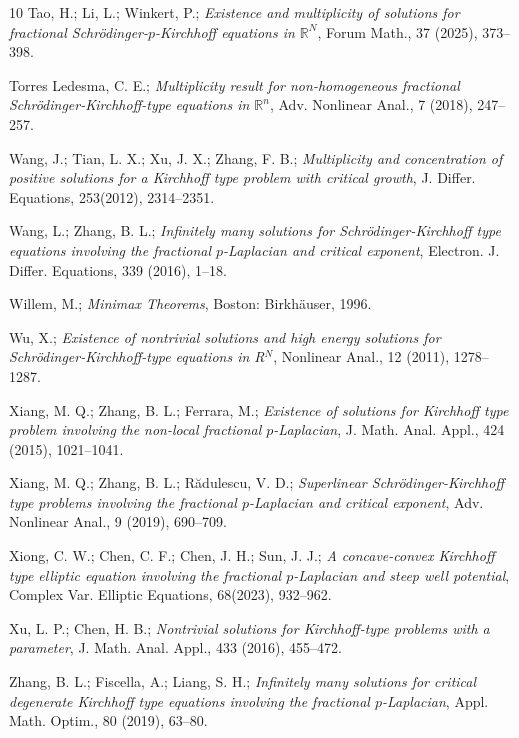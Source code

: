 \documentclass[reqno]{amsart}
\begin{document}
\begin{thebibliography}{10}
 Tao, H.; Li, L.; Winkert, P.;
\emph{Existence and multiplicity of solutions for fractional Schr\"{o}dinger-$p$-Kirchhoff equations in $\mathbb{R}^N$},
Forum Math., 37 (2025), 373--398.

 Torres Ledesma, C. E.;
\emph{Multiplicity result for non-homogeneous fractional Schr\"{o}dinger-Kirchhoff-type equations in $\mathbb{R}^n$},
Adv. Nonlinear Anal., 7 (2018), 247--257.

 Wang, J.; Tian, L. X.; Xu, J. X.; Zhang, F. B.;
\emph{Multiplicity and concentration of positive solutions for a Kirchhoff type problem with critical growth},
J. Differ. Equations, 253(2012), 2314--2351.

 Wang, L.; Zhang, B. L.;
\emph{Infinitely many solutions for Schr\"{o}dinger-Kirchhoff type equations involving the fractional $p$-Laplacian and critical exponent},
Electron. J. Differ. Equations, 339 (2016), 1--18.

 Willem, M.;
\emph{Minimax Theorems},
Boston: Birkh\"{a}user, 1996.

 Wu, X.;
\emph{Existence of nontrivial solutions and high energy solutions for Schr\"{o}dinger-Kirchhoff-type equations in R$^N$},
Nonlinear Anal., 12 (2011), 1278--1287.

 Xiang, M. Q.; Zhang, B. L.; Ferrara, M.;
\emph{Existence of solutions for Kirchhoff type problem involving the non-local fractional $p$-Laplacian},
J. Math. Anal. Appl., 424 (2015), 1021--1041.

 Xiang, M. Q.; Zhang, B. L.; R\u{a}dulescu, V. D.;
\emph{Superlinear Schr\"{o}dinger-Kirchhoff type problems involving the fractional $p$-Laplacian and critical exponent},
Adv. Nonlinear Anal., 9 (2019), 690--709.

 Xiong, C. W.; Chen, C. F.; Chen, J. H.; Sun, J. J.;
\emph{A concave-convex Kirchhoff type elliptic equation involving the fractional $p$-Laplacian and steep well potential},
Complex Var. Elliptic Equations, 68(2023), 932--962.

 Xu, L. P.; Chen, H. B.;
\emph{Nontrivial solutions for Kirchhoff-type problems with a parameter},
J. Math. Anal. Appl., 433 (2016), 455--472.

 Zhang, B. L.; Fiscella, A.; Liang, S. H.;
\emph{Infinitely many solutions for critical degenerate Kirchhoff type equations involving the fractional $p$-Laplacian},
Appl. Math. Optim., 80 (2019), 63--80.

\end{thebibliography}
\end{document}
